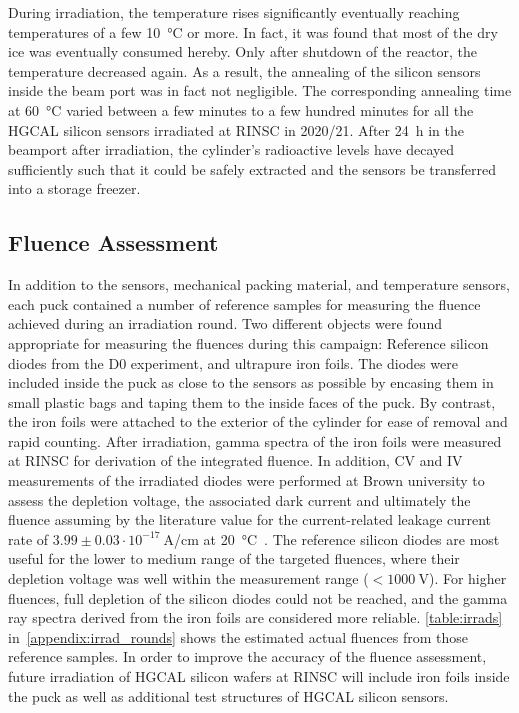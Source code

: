 During irradiation, the temperature rises significantly eventually reaching temperatures of a few \SI{+10}{\celsius} or more.
In fact, it was found that most of the dry ice was eventually consumed hereby.
Only after shutdown of the reactor, the temperature decreased again.
As a result, the annealing of the silicon sensors inside the beam port was in fact not negligible.
The corresponding annealing time at \SI{60}{\celsius} varied between a few minutes to a few hundred minutes for all the HGCAL silicon sensors irradiated at RINSC in 2020/21.
After \SI{24}{\hour} in the beamport after irradiation, the cylinder's radioactive levels have decayed sufficiently such that it could be safely extracted and the sensors be transferred into a storage freezer.

\subsection{Fluence Assessment}
In addition to the sensors, mechanical packing material, and temperature sensors, each puck contained a number of reference samples for measuring the fluence achieved during an irradiation round. 
Two different objects were found appropriate for measuring the fluences during this campaign: Reference silicon diodes from the D0 experiment, and ultrapure iron foils. 
The diodes were included inside the puck as close to the sensors as possible by encasing them in small plastic bags and taping them to the inside faces of the puck. 
By contrast, the iron foils were attached to the exterior of the cylinder for ease of removal and rapid counting. 
After irradiation, gamma spectra of the iron foils were measured at RINSC for derivation of the integrated fluence.
In addition, CV and IV measurements of the irradiated diodes were performed at Brown university to assess the depletion voltage, the associated dark current and ultimately the fluence assuming by the literature value for the current-related leakage current rate of $3.99\pm 0.03\cdot 10^{-17}~$A/cm at \SI{20}{\celsius}~\cite{moll:SiDamages}.
The reference silicon diodes are most useful for the lower to medium range of the targeted fluences,  where their depletion voltage was well within the measurement range ($<\SI{1000}{\volt}$).
For higher fluences, full depletion of the silicon diodes could not be reached, and the gamma ray spectra derived from the iron foils are considered more reliable.
\ref{table:irrads} in~\ref{appendix:irrad_rounds} shows the estimated actual fluences from those reference samples.
In order to improve the accuracy of the fluence assessment, future irradiation of HGCAL silicon wafers at RINSC will include iron foils inside the puck as well as additional test structures of HGCAL silicon sensors.